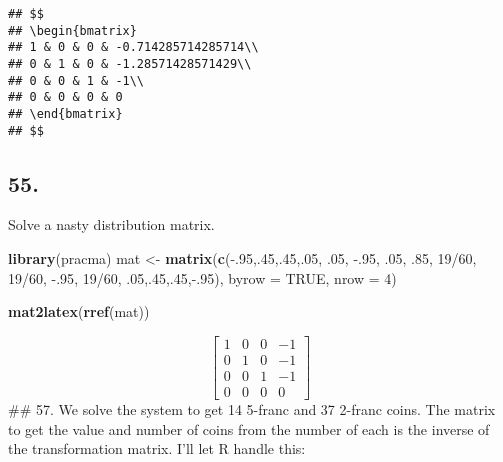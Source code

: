 \documentclass[]{article}
\newenvironment{Shaded}{\begin{snugshade}}{\end{snugshade}}
\newcommand{\DataTypeTok}[1]{\textcolor[rgb]{0.00,0.34,0.68}{#1}}
\newcommand{\DecValTok}[1]{\textcolor[rgb]{0.69,0.50,0.00}{#1}}
\newcommand{\FloatTok}[1]{\textcolor[rgb]{0.69,0.50,0.00}{#1}}
\newcommand{\KeywordTok}[1]{\textcolor[rgb]{0.12,0.11,0.11}{\textbf{#1}}}
\newcommand{\NormalTok}[1]{\textcolor[rgb]{0.12,0.11,0.11}{#1}}
\newcommand{\OperatorTok}[1]{\textcolor[rgb]{0.12,0.11,0.11}{#1}}
\newcommand{\OtherTok}[1]{\textcolor[rgb]{0.00,0.43,0.16}{#1}}
\newcommand{\StringTok}[1]{\textcolor[rgb]{0.75,0.01,0.01}{#1}}
\begin{document}
\begin{verbatim}
## $$
## \begin{bmatrix}
## 1 & 0 & 0 & -0.714285714285714\\
## 0 & 1 & 0 & -1.28571428571429\\
## 0 & 0 & 1 & -1\\
## 0 & 0 & 0 & 0
## \end{bmatrix}
## $$
\end{verbatim}

\hypertarget{section-11}{%
\subsection{55.}\label{section-11}}

Solve a nasty distribution matrix.

\begin{Shaded}
\begin{Highlighting}[]
\KeywordTok{library}\NormalTok{(pracma)}
\NormalTok{mat <-}\StringTok{ }\KeywordTok{matrix}\NormalTok{(}\KeywordTok{c}\NormalTok{(}\OperatorTok{-}\NormalTok{.}\DecValTok{95}\NormalTok{,.}\DecValTok{45}\NormalTok{,.}\DecValTok{45}\NormalTok{,.}\DecValTok{05}\NormalTok{,}
                \FloatTok{.05}\NormalTok{, }\FloatTok{-.95}\NormalTok{, }\FloatTok{.05}\NormalTok{, }\FloatTok{.85}\NormalTok{,}
                \DecValTok{19}\OperatorTok{/}\DecValTok{60}\NormalTok{, }\DecValTok{19}\OperatorTok{/}\DecValTok{60}\NormalTok{, }\FloatTok{-.95}\NormalTok{, }\DecValTok{19}\OperatorTok{/}\DecValTok{60}\NormalTok{,}
                \FloatTok{.05}\NormalTok{,.}\DecValTok{45}\NormalTok{,.}\DecValTok{45}\NormalTok{,}\OperatorTok{-}\NormalTok{.}\DecValTok{95}\NormalTok{), }\DataTypeTok{byrow =} \OtherTok{TRUE}\NormalTok{, }\DataTypeTok{nrow =} \DecValTok{4}\NormalTok{)}

\KeywordTok{mat2latex}\NormalTok{(}\KeywordTok{rref}\NormalTok{(mat))}
\end{Highlighting}
\end{Shaded}

\[
\begin{bmatrix}
1 & 0 & 0 & -1\\
0 & 1 & 0 & -1\\
0 & 0 & 1 & -1\\
0 & 0 & 0 & 0
\end{bmatrix}
\] \#\# 57. We solve the system to get 14 5-franc and 37 2-franc coins.
The matrix to get the value and number of coins from the number of each
is the inverse of the transformation matrix. I'll let R handle this:
\end{document}

